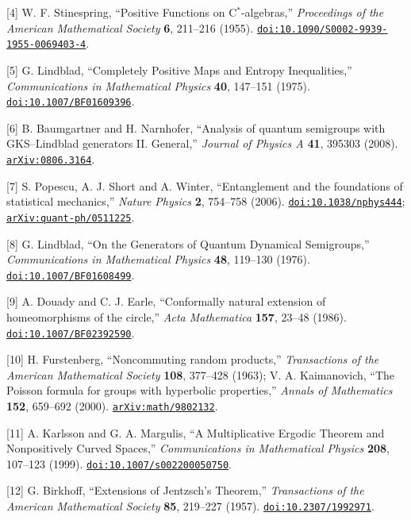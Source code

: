 \documentclass[
  11pt,
  a4paper,
]{article}
\begin{document}
{[}4{]} W. F. Stinespring, ``Positive Functions on C\(^*\)-algebras,'' \emph{Proceedings of the American Mathematical Society} \textbf{6}, 211--216 (1955). \href{https://doi.org/10.1090/S0002-9939-1955-0069403-4}{\nolinkurl{doi:10.1090/S0002-9939-1955-0069403-4}}.

{[}5{]} G. Lindblad, ``Completely Positive Maps and Entropy Inequalities,'' \emph{Communications in Mathematical Physics} \textbf{40}, 147--151 (1975). \href{https://doi.org/10.1007/BF01609396}{\nolinkurl{doi:10.1007/BF01609396}}.

{[}6{]} B. Baumgartner and H. Narnhofer, ``Analysis of quantum semigroups with GKS--Lindblad generators II. General,'' \emph{Journal of Physics A} \textbf{41}, 395303 (2008). \href{https://arxiv.org/abs/0806.3164}{\nolinkurl{arXiv:0806.3164}}.

{[}7{]} S. Popescu, A. J. Short and A. Winter, ``Entanglement and the foundations of statistical mechanics,'' \emph{Nature Physics} \textbf{2}, 754--758 (2006). \href{https://doi.org/10.1038/nphys444}{\nolinkurl{doi:10.1038/nphys444}}; \href{https://arxiv.org/abs/quant-ph/0511225}{\nolinkurl{arXiv:quant-ph/0511225}}.

{[}8{]} G. Lindblad, ``On the Generators of Quantum Dynamical Semigroups,'' \emph{Communications in Mathematical Physics} \textbf{48}, 119--130 (1976). \href{https://doi.org/10.1007/BF01608499}{\nolinkurl{doi:10.1007/BF01608499}}.

{[}9{]} A. Douady and C. J. Earle, ``Conformally natural extension of homeomorphisms of the circle,'' \emph{Acta Mathematica} \textbf{157}, 23--48 (1986). \href{https://doi.org/10.1007/BF02392590}{\nolinkurl{doi:10.1007/BF02392590}}.

{[}10{]} H. Furstenberg, ``Noncommuting random products,'' \emph{Transactions of the American Mathematical Society} \textbf{108}, 377--428 (1963); V. A. Kaimanovich, ``The Poisson formula for groups with hyperbolic properties,'' \emph{Annals of Mathematics} \textbf{152}, 659--692 (2000). \href{https://arxiv.org/abs/math/9802132}{\nolinkurl{arXiv:math/9802132}}.

{[}11{]} A. Karlsson and G. A. Margulis, ``A Multiplicative Ergodic Theorem and Nonpositively Curved Spaces,'' \emph{Communications in Mathematical Physics} \textbf{208}, 107--123 (1999). \href{https://doi.org/10.1007/s002200050750}{\nolinkurl{doi:10.1007/s002200050750}}.

{[}12{]} G. Birkhoff, ``Extensions of Jentzsch's Theorem,'' \emph{Transactions of the American Mathematical Society} \textbf{85}, 219--227 (1957). \href{https://doi.org/10.2307/1992971}{\nolinkurl{doi:10.2307/1992971}}.
\end{document}
